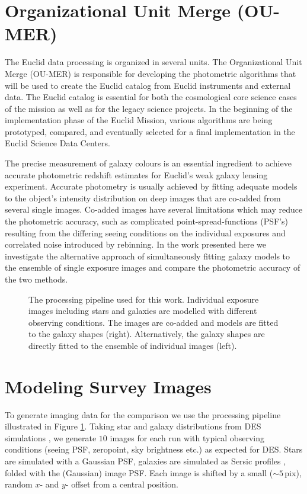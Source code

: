 \section{Organizational Unit Merge (OU-MER)}
The Euclid data processing is organized in several units. The Organizational Unit Merge (OU-MER) is responsible for developing the photometric algorithms that will be used to create the Euclid catalog from Euclid instruments and external data. The Euclid catalog is essential for both the cosmological core science cases of the mission as well as for the legacy science projects. In the beginning of the implementation phase of the Euclid Mission, various algorithms are being prototyped, compared, and eventually selected for a final implementation in the Euclid Science Data Centers.

The precise measurement of galaxy colours is an essential ingredient to achieve accurate photometric redshift estimates for Euclid's weak galaxy lensing experiment. Accurate photometry is usually achieved by fitting adequate models to the object's intensity distribution on deep images that are co-added from several single images. Co-added images have several limitations which may reduce the photometric accuracy, such as complicated point-spread-functions (PSF's) resulting from the differing seeing conditions on the individual exposures and correlated noise introduced by rebinning. In the work presented here we investigate the alternative approach of simultaneously fitting galaxy models to the ensemble of single exposure images and compare the photometric accuracy of the two methods.

%
\begin{figure}[t]
\caption{The processing pipeline used for this work. Individual exposure images including stars and galaxies are modelled with different observing conditions. The images are co-added and models are fitted to the galaxy shapes (right). Alternatively, the galaxy shapes are directly fitted to the ensemble of individual images (left).}
\label{Kufig1}
\end{figure}
%
\section{Modeling Survey Images}
To generate imaging data for the comparison we use the processing pipeline illustrated in Figure \ref{Kufig1}. Taking star and galaxy distributions from DES simulations \citep{2010AAS...21547007L}, we generate $10$ images for each run with typical observing conditions (seeing PSF, zeropoint, sky brightness etc.) as expected for DES. Stars are simulated with a Gaussian PSF, galaxies are simulated as Sersic profiles \citep{1968adga.book.S}, folded with the (Gaussian) image PSF. Each image is shifted by a small ($\sim5$\,pix), random $x$- and $y$- offset from a central position.

